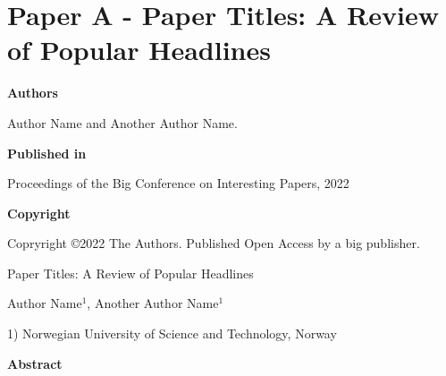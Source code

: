 \chapter{Paper A - Paper Titles: A Review of Popular Headlines}

\noindent \textbf{Authors}

\vspace*{0.3cm}

\noindent Author Name and Another Author Name.

\vspace*{0.7cm}

\noindent \textbf{Published in}

\vspace*{0.3cm}

\noindent Proceedings of the Big Conference on Interesting Papers, 2022

\vspace*{0.7cm}

\noindent \textbf{Copyright}

\vspace*{0.3cm}

\noindent Copryright ©2022 The Authors. Published Open Access by a big publisher.

\newpage

\vspace*{0.1cm}

\begin{center}

\Huge{Paper Titles: A Review of Popular Headlines}

\vspace{0.6cm}

\large{Author Name$^{1}$, Another Author Name$^{1}$}

\vspace{0.1cm}

\small{1) Norwegian University of Science and Technology, Norway}
\end{center}

\vspace{0.2cm}

\begin{center}
  \textbf{Abstract}
\end{center}
\begin{changemargin}{0.75cm}{0.75cm} 
\lipsum[2]
\end{changemargin}

\vspace{1cm}

